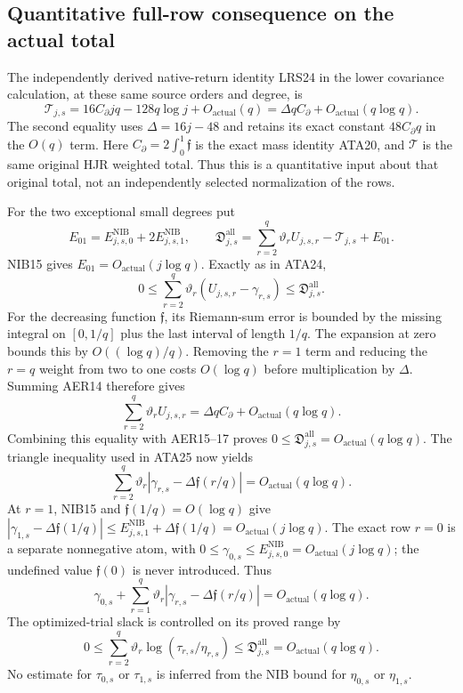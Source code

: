 \subsection{Quantitative full-row consequence on the actual total}
The independently derived native-return identity LRS24 in the lower
covariance calculation, at these same source orders and degree, is
\[
 \mathcal T_{j,s}
 =16C_\partial jq-128q\log j+O_{\mathrm{actual}}(q)
 =\Delta qC_\partial+O_{\mathrm{actual}}(q\log q).        \tag{AER15}
\]
The second equality uses $\Delta=16j-48$ and retains its exact
constant $48C_\partial q$ in the $O(q)$ term.
Here $C_\partial=2\int_0^1\mathfrak f$ is the exact mass identity
ATA20, and $\mathcal T$ is the same original HJR weighted total.
Thus this is a quantitative input about that original total,
not an independently selected normalization of the rows.

For the two exceptional small degrees put
\[
 E_{01}=E^{\mathrm{NIB}}_{j,s,0}
                  +2E^{\mathrm{NIB}}_{j,s,1},\qquad
 \mathfrak D^{\mathrm{all}}_{j,s}
 =\sum_{r=2}^q\vartheta_rU_{j,s,r}-\mathcal T_{j,s}+E_{01}.
                                                               \tag{AER16}
\]
NIB15 gives $E_{01}=O_{\mathrm{actual}}(j\log q)$.
Exactly as in ATA24,
\[
 0\le\sum_{r=2}^q\vartheta_r(U_{j,s,r}-\gamma_{r,s})
              \le\mathfrak D^{\mathrm{all}}_{j,s}.       \tag{AER17}
\]
For the decreasing function $\mathfrak f$, its Riemann-sum error
is bounded by the missing integral on $[0,1/q]$ plus the last
interval of length $1/q$.  The expansion at zero bounds this by
$O((\log q)/q)$.  Removing the $r=1$ term and reducing the $r=q$
weight from two to one costs $O(\log q)$ before multiplication by
$\Delta$.  Summing AER14 therefore gives
\[
 \sum_{r=2}^q\vartheta_rU_{j,s,r}
 =\Delta qC_\partial+O_{\mathrm{actual}}(q\log q).
\]
Combining this equality with AER15--17 proves
$0\le\mathfrak D^{\mathrm{all}}_{j,s}
=O_{\mathrm{actual}}(q\log q)$.
The triangle inequality used in ATA25 now yields
\[
 \sum_{r=2}^q\vartheta_r
       |\gamma_{r,s}-\Delta\mathfrak f(r/q)|
              =O_{\mathrm{actual}}(q\log q).             \tag{AER18}
\]
At $r=1$, NIB15 and $\mathfrak f(1/q)=O(\log q)$ give
$|\gamma_{1,s}-\Delta\mathfrak f(1/q)|
\le E^{\mathrm{NIB}}_{j,s,1}+\Delta\mathfrak f(1/q)
=O_{\mathrm{actual}}(j\log q)$.
The exact row $r=0$ is a separate nonnegative atom, with
$0\le\gamma_{0,s}\le E^{\mathrm{NIB}}_{j,s,0}
=O_{\mathrm{actual}}(j\log q)$; the undefined value
$\mathfrak f(0)$ is never introduced.  Thus
\[
 \boxed{\quad
 \gamma_{0,s}+\sum_{r=1}^q\vartheta_r
         |\gamma_{r,s}-\Delta\mathfrak f(r/q)|
          =O_{\mathrm{actual}}(q\log q).
 \quad}                                                \tag{AER19}
\]
The optimized-trial slack is controlled on its proved range by
\[
 0\le\sum_{r=2}^q\vartheta_r\log(\tau_{r,s}/\eta_{r,s})
       \le\mathfrak D^{\mathrm{all}}_{j,s}
       =O_{\mathrm{actual}}(q\log q).                   \tag{AER20}
\]
No estimate for $\tau_{0,s}$ or $\tau_{1,s}$ is inferred from the
NIB bound for $\eta_{0,s}$ or $\eta_{1,s}$.

